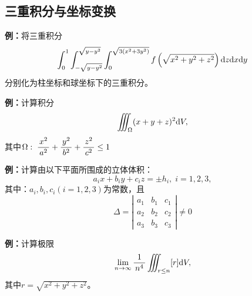 \begin{center}
\end{center}

\subsection{三重积分与坐标变换}

{\bf 例：}将三重积分
$$\displaystyle\int_0^1\displaystyle\int_{-\sqrt{y-y^2}}^{\sqrt{y-y^2}}
\displaystyle\int_0^{\sqrt{3(x^2+3y^2)}}f\left(
\sqrt{x^2+y^2+z^2}\right)\mathrm{d} z\mathrm{d} x\mathrm{d} y$$
分别化为柱坐标和球坐标下的三重积分。

{\bf 例：}计算积分
$$\iiint_{\Omega}(x+y+z)^2\mathrm{d} V,$$
其中$\Omega:\;\displaystyle\frac{\,{x^2}\,}{\,{a^2}\,}+\displaystyle\frac{\,{y^2}\,}{\,{b^2}\,}+\displaystyle\frac{\,{z^2}\,}{\,{c^2}\,}\leq 1$

{\bf 例：}计算由以下平面所围成的立体体积：
$$a_ix+b_iy+c_iz=\pm h_i,\;i=1,2,3,$$
其中：$a_i,b_i,c_i(i=1,2,3)$为常数，且
$$\Delta=\left|\begin{array}{ccc}
a_1 & b_1 & c_1\\ a_2 & b_2 & c_2 \\ a_3 & b_3 & c_3
\end{array}\right|\ne 0$$

{\bf 例：}计算极限
$$\lim\limits_{n\to\infty}\displaystyle\frac{\,{1}\,}{\,{n^4}\,}\iiint_{r\leq n}[r]\mathrm{d} V,$$
其中$r=\sqrt{x^2+y^2+z^2}$。

